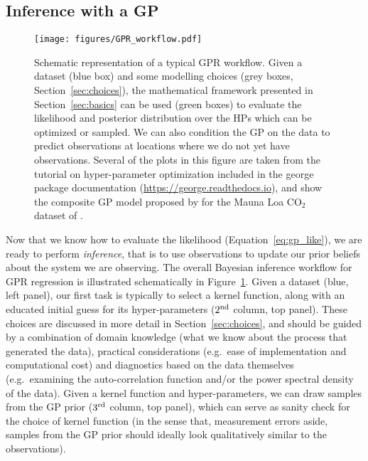 \documentclass[letterpaper]{ar-1col}
\begin{document}
\subsection{Inference with a GP}\label{sec:gp-inf}

\begin{figure}[ht]
  \centering
  \texttt{[image: figures/GPR\_workflow.pdf]}
  \caption{Schematic representation of a typical GPR workflow. Given a dataset (blue box) and some modelling choices (grey boxes, Section~\ref{sec:choices}), the mathematical framework presented in Section~\ref{sec:basics} can be used (green boxes) to evaluate the likelihood and posterior distribution over the HPs which can be optimized or sampled. We can also condition the GP on the data to predict observations at locations where we do not yet have observations. Several of the plots in this figure are taken from the 
  tutorial on hyper-parameter optimization included in the {\sc george} package documentation (\url{https://george.readthedocs.io}), and show the composite GP model proposed by \citet{gpml} for the Mauna Loa CO$_2$ dataset of \citet{MaunaLoaCO2}.}  
  \label{fig:GPR_workflow}
\end{figure}

Now that we know how to evaluate the likelihood (Equation~\ref{eq:gp_like}), we are ready to perform \textit{inference}, that is to use observations to update our prior beliefs about the system we are observing. The overall Bayesian inference workflow for GPR regression is illustrated schematically in Figure~\ref{fig:GPR_workflow}. Given a dataset (blue, left panel), our first task is typically to select a kernel function, along with an educated initial guess for its hyper-parameters ($2^{\rm nd}$ column, top panel). These choices are discussed in more detail in Section~\ref{sec:choices}, and should be guided by a combination of domain knowledge (what we know about the process that generated the data), practical considerations (e.g.\ ease of implementation and computational cost) and diagnostics based on the data themselves (e.g.\ examining the auto-correlation function and/or the power spectral density of the data). Given a kernel function and hyper-parameters, we can draw samples from the GP prior ($3^{\rm rd}$ column, top panel), which can serve as sanity check for the choice of kernel function (in the sense that, measurement errors aside, samples from the GP prior should ideally look qualitatively similar to the observations). 
\end{document}
